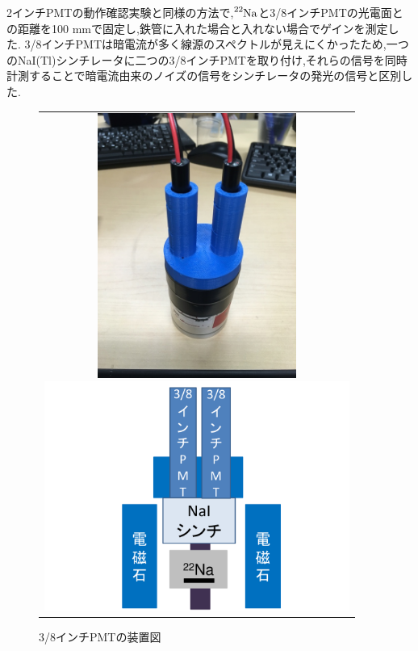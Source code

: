 2インチPMTの動作確認実験と同様の方法で,$\ce{^{22}Na}$と3/8インチPMTの光電面との距離を100 mmで固定し,鉄管に入れた場合と入れない場合でゲインを測定した.
3/8インチPMTは暗電流が多く線源のスペクトルが見えにくかったため,一つのNaI(Tl)シンチレータに二つの3/8インチPMTを取り付け,それらの信号を同時計測することで暗電流由来のノイズの信号をシンチレータの発光の信号と区別した.

\begin{figure}[tbp]
  \begin{center}
    \begin{tabular}{c}
      \begin{minipage}[tbp]{0.4\hsize}    
        \begin{center}
          \includegraphics[width=6.5cm]{fig/iguchi/PPMT.jpg}
	\caption{3/8インチPMTの同時計測用治具}
	\label{PPMT}
     \end{center}
    \end{minipage}
      \begin{minipage}[tbp]{0.6\hsize}    
        \begin{center}
          \includegraphics[width=10cm]{fig/iguchi/miniset.pdf}
         \caption{3/8インチPMTの装置図}
	\label{miniset}
         \end{center}
        \end{minipage}
     
     \end{tabular}
    \end{center}
   \end{figure}
   
